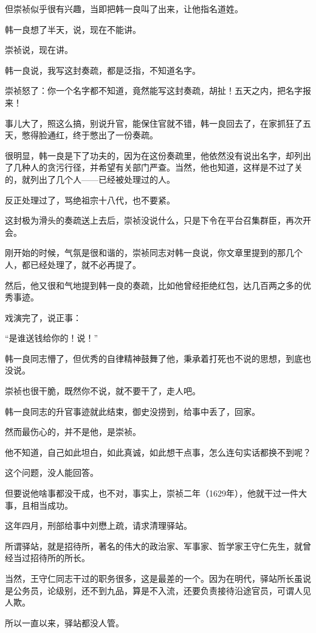 \begin{multicols}{\theparacolNo}
		但崇祯似乎很有兴趣，当即把韩一良叫了出来，让他指名道姓。

		韩一良想了半天，说，现在不能讲。

		崇祯说，现在讲。

		韩一良说，我写这封奏疏，都是泛指，不知道名字。

		崇祯怒了：你一个名字都不知道，竟然能写这封奏疏，胡扯！五天之内，把名字报来！

		事儿大了，照这么搞，别说升官，能保住官就不错，韩一良回去了，在家抓狂了五天，憋得脸通红，终于憋出了一份奏疏。

		很明显，韩一良是下了功夫的，因为在这份奏疏里，他依然没有说出名字，却列出了几种人的贪污行径，并希望有关部门严查。当然，他也知道，这样是不过了关的，就列出了几个人——已经被处理过的人。

		反正处理过了，骂绝祖宗十八代，也不要紧。

		这封极为滑头的奏疏送上去后，崇祯没说什么，只是下令在平台召集群臣，再次开会。

		刚开始的时候，气氛是很和谐的，崇祯同志对韩一良说，你文章里提到的那几个人，都已经处理了，就不必再提了。

		然后，他又很和气地提到韩一良的奏疏，比如他曾经拒绝红包，达几百两之多的优秀事迹。

		戏演完了，说正事：

		“是谁送钱给你的！说！”

		韩一良同志懵了，但优秀的自律精神鼓舞了他，秉承着打死也不说的思想，到底也没说。

		崇祯也很干脆，既然你不说，就不要干了，走人吧。

		韩一良同志的升官事迹就此结束，御史没捞到，给事中丢了，回家。

		然而最伤心的，并不是他，是崇祯。

		他不知道，自己如此坦白，如此真诚，如此想干点事，怎么连句实话都换不到呢？

		这个问题，没人能回答。

		但要说他啥事都没干成，也不对，事实上，崇祯二年（1629年），他就干过一件大事，且相当成功。

		这年四月，刑部给事中刘懋上疏，请求清理驿站。

		所谓驿站，就是招待所，著名的伟大的政治家、军事家、哲学家王守仁先生，就曾经当过招待所的所长。

		当然，王守仁同志干过的职务很多，这是最差的一个。因为在明代，驿站所长虽说是公务员，论级别，还不到九品，算是不入流，还要负责接待沿途官员，可谓人见人欺。

		所以一直以来，驿站都没人管。


\end{multicols}
